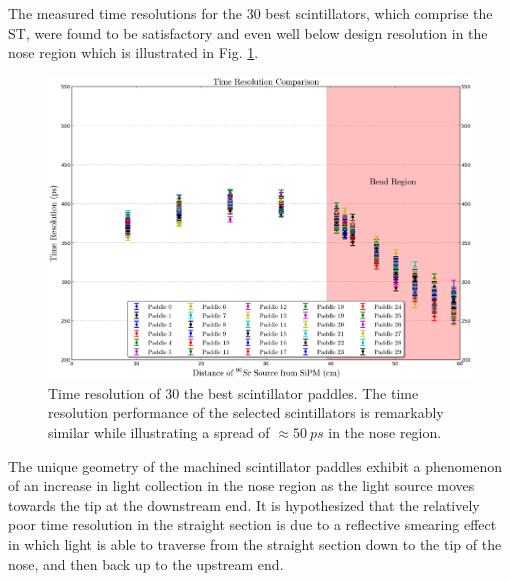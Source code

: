 The measured time resolutions for the 30 best scintillators, which comprise the ST, were found to be satisfactory and even well below design resolution in the nose region which is illustrated in Fig. \ref{fig:time_res_comp_final_30}.
\begin{figure}[!htb]
	\centering
	\includegraphics[width=1.0\columnwidth]{fabrication/figs/time_res_comp_final_30}
	\caption[Time resolution of the 30 best scintillator paddles]{Time resolution of 30 the best scintillator paddles.  The time resolution performance of the selected scintillators is remarkably similar while illustrating a spread of $\approx 50\ ps$ in the nose region.}
	\label{fig:time_res_comp_final_30}
\end{figure}

The unique geometry of the machined scintillator paddles exhibit a phenomenon of an increase in light collection in the nose region as the light source moves towards the tip at the downstream end.  It is hypothesized that the relatively poor time resolution in the straight section is due to a reflective smearing effect in which light is able to traverse from the straight section down to the tip of the nose, and then back up to the upstream end.

